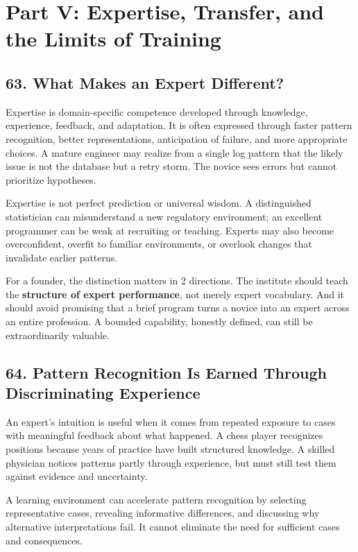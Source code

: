 \section*{Part V: Expertise, Transfer, and the Limits of Training}

\subsection*{63. What Makes an Expert Different?}

Expertise is domain-specific competence developed through knowledge, experience, feedback, and adaptation. It is often expressed through faster pattern recognition, better representations, anticipation of failure, and more appropriate choices. A mature engineer may realize from a single log pattern that the likely issue is not the database but a retry storm. The novice sees errors but cannot prioritize hypotheses.

Expertise is not perfect prediction or universal wisdom. A distinguished statistician can misunderstand a new regulatory environment; an excellent programmer can be weak at recruiting or teaching. Experts may also become overconfident, overfit to familiar environments, or overlook changes that invalidate earlier patterns.

For a founder, the distinction matters in 2 directions. The institute should teach the \textbf{structure of expert performance}, not merely expert vocabulary. And it should avoid promising that a brief program turns a novice into an expert across an entire profession. A bounded capability, honestly defined, can still be extraordinarily valuable.

\subsection*{64. Pattern Recognition Is Earned Through Discriminating Experience}

An expert's intuition is useful when it comes from repeated exposure to cases with meaningful feedback about what happened. A chess player recognizes positions because years of practice have built structured knowledge. A skilled physician notices patterns partly through experience, but must still test them against evidence and uncertainty.

A learning environment can accelerate pattern recognition by selecting representative cases, revealing informative differences, and discussing why alternative interpretations fail. It cannot eliminate the need for sufficient cases and consequences.

